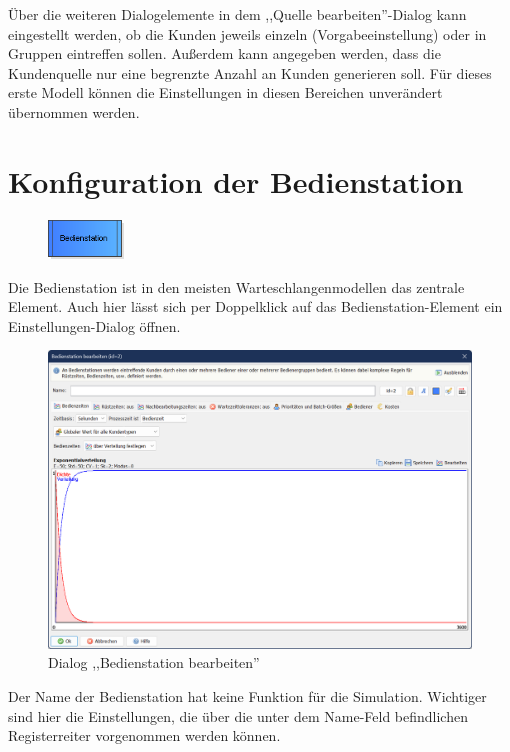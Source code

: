 \documentclass[deutsch]{svmono}
\begin{document}
Über die weiteren Dialogelemente in dem ,,Quelle bearbeiten''-Dialog kann eingestellt werden, ob die Kunden jeweils einzeln (Vorgabeeinstellung) oder in Gruppen eintreffen sollen. Außerdem kann angegeben werden, dass die Kundenquelle nur eine begrenzte Anzahl an Kunden generieren soll. Für dieses erste Modell können die Einstellungen in diesen Bereichen unverändert übernommen werden.

\section{Konfiguration der Bedienstation}

\begin{figure}
\vspace{-22pt}
\includegraphics[width=2cm]{IconProcess.png}
\vspace{-22pt}
\end{figure}
Die Bedienstation ist in den meisten Warteschlangenmodellen das zentrale Element. Auch hier lässt sich per Doppelklick auf das Bedienstation-Element ein Einstellungen-Dialog öffnen.

\begin{figure}[H]	
	\caption{Dialog ,,Bedienstation bearbeiten''}
	\centerline{\includegraphics[width=14cm]{DialogProcess.png}}
	\label{fig:DialogProcess}
\end{figure}
 
Der Name der Bedienstation hat keine Funktion für die Simulation. Wichtiger sind hier die Einstellungen, die über die unter dem Name-Feld befindlichen Registerreiter vorgenommen werden können.
\end{document}
